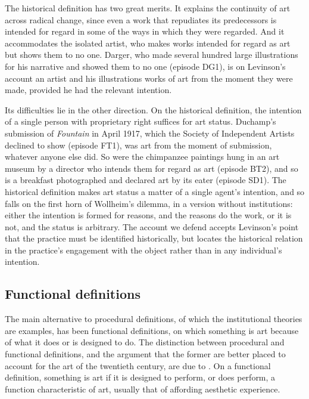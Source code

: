 \documentclass{situationist-preprint}
\begin{document}
The historical definition has two great merits. It explains the continuity of art across radical change, since even a work that repudiates its predecessors is intended for regard in some of the ways in which they were regarded. And it accommodates the isolated artist, who makes works intended for regard as art but shows them to no one. Darger, who made several hundred large illustrations for his narrative and showed them to no one (episode DG1), is on Levinson's account an artist and his illustrations works of art from the moment they were made, provided he had the relevant intention.

Its difficulties lie in the other direction. On the historical definition, the intention of a single person with proprietary right suffices for art status. Duchamp's submission of \emph{Fountain} in April 1917, which the Society of Independent Artists declined to show (episode FT1), was art from the moment of submission, whatever anyone else did. So were the chimpanzee paintings hung in an art museum by a director who intends them for regard as art (episode BT2), and so is a breakfast photographed and declared art by its eater (episode SD1). The historical definition makes art status a matter of a single agent's intention, and so falls on the first horn of Wollheim's dilemma, in a version without institutions: either the intention is formed for reasons, and the reasons do the work, or it is not, and the status is arbitrary. The account we defend accepts Levinson's point that the practice must be identified historically, but locates the historical relation in the practice's engagement with the object rather than in any individual's intention.

\subsection{Functional definitions}

The main alternative to procedural definitions, of which the institutional theories are examples, has been functional definitions, on which something is art because of what it does or is designed to do. The distinction between procedural and functional definitions, and the argument that the former are better placed to account for the art of the twentieth century, are due to \citet{Davies1991}. On a functional definition, something is art if it is designed to perform, or does perform, a function characteristic of art, usually that of affording aesthetic experience.
\end{document}
